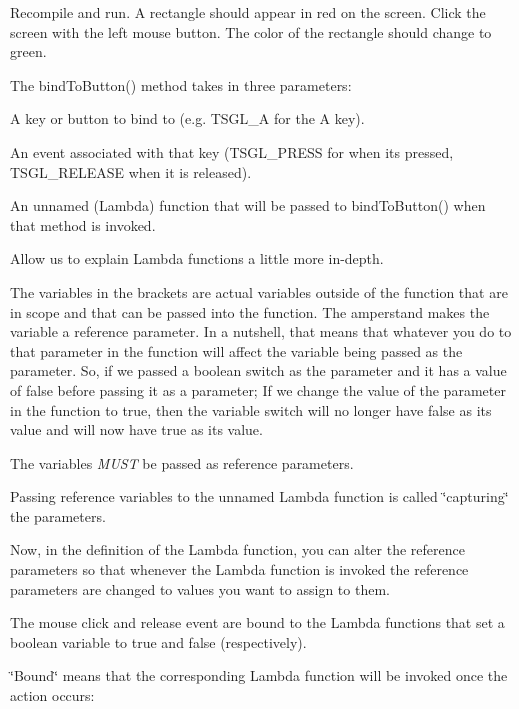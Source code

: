 Recompile and run. A rectangle should appear in red on the screen. Click the screen with the left mouse button. The color of the rectangle should change to green.

The bind\+To\+Button() method takes in three parameters\+:
\begin{DoxyItemize}
\item A key or button to bind to (e.\+g. T\+S\+G\+L\+\_\+\+A for the \textquotesingle{}A\textquotesingle{} key).
\item An event associated with that key (T\+S\+G\+L\+\_\+\+P\+R\+E\+S\+S for when it\textquotesingle{}s pressed, T\+S\+G\+L\+\_\+\+R\+E\+L\+E\+A\+S\+E when it is released).
\item An unnamed (Lambda) function that will be passed to bind\+To\+Button() when that method is invoked.
\end{DoxyItemize}

Allow us to explain Lambda functions a little more in-\/depth.

The variables in the brackets are actual variables outside of the function that are in scope and that can be passed into the function. The amperstand makes the variable a reference parameter. In a nutshell, that means that whatever you do to that parameter in the function will affect the variable being passed as the parameter. So, if we passed a boolean {\ttfamily switch} as the parameter and it has a value of {\ttfamily false} before passing it as a parameter; If we change the value of the parameter in the function to {\ttfamily true}, then the variable {\ttfamily switch} will no longer have {\ttfamily false} as its value and will now have {\ttfamily true} as its value.

The variables {\itshape M\+U\+S\+T} be passed as reference parameters.

Passing reference variables to the unnamed Lambda function is called \char`\"{}capturing\char`\"{} the parameters.

Now, in the definition of the Lambda function, you can alter the reference parameters so that whenever the Lambda function is invoked the reference parameters are changed to values you want to assign to them.

The mouse click and release event are bound to the Lambda functions that set a boolean variable to true and false (respectively).

\char`\"{}\+Bound\char`\"{} means that the corresponding Lambda function will be invoked once the action occurs\+:


